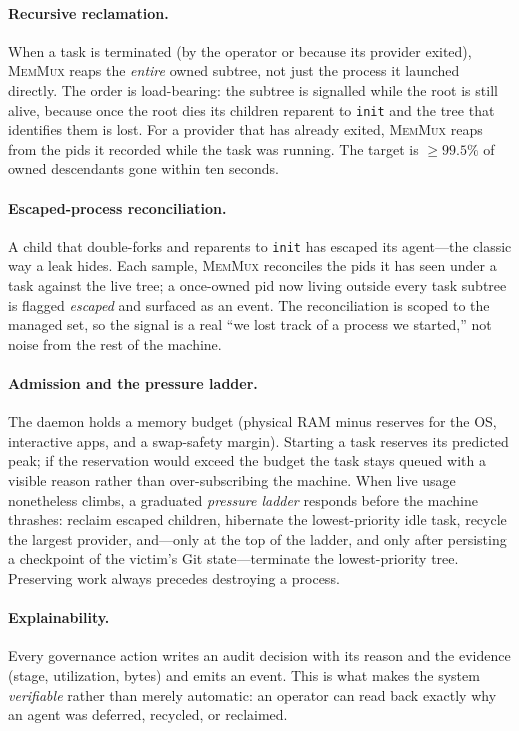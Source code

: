 \documentclass[11pt]{article}
\newcommand{\sys}{\textsc{MemMux}}
\newcommand{\code}[1]{\texttt{#1}}
\begin{document}
\paragraph{Recursive reclamation.} When a task is terminated (by the operator or because its
provider exited), \sys{} reaps the \emph{entire} owned subtree, not just the process it launched
directly. The order is load-bearing: the subtree is signalled while the root is still alive, because
once the root dies its children reparent to \code{init} and the tree that identifies them is lost.
For a provider that has already exited, \sys{} reaps from the pids it recorded while the task was
running. The target is $\geq 99.5\%$ of owned descendants gone within ten seconds.

\paragraph{Escaped-process reconciliation.} A child that double-forks and reparents to \code{init}
has escaped its agent---the classic way a leak hides. Each sample, \sys{} reconciles the pids it has
seen under a task against the live tree; a once-owned pid now living outside every task subtree is
flagged \emph{escaped} and surfaced as an event. The reconciliation is scoped to the managed set, so
the signal is a real ``we lost track of a process we started,'' not noise from the rest of the
machine.

\paragraph{Admission and the pressure ladder.} The daemon holds a memory budget (physical RAM minus
reserves for the OS, interactive apps, and a swap-safety margin). Starting a task reserves its
predicted peak; if the reservation would exceed the budget the task stays queued with a visible
reason rather than over-subscribing the machine. When live usage nonetheless climbs, a graduated
\emph{pressure ladder} responds before the machine thrashes: reclaim escaped children, hibernate the
lowest-priority idle task, recycle the largest provider, and---only at the top of the ladder, and
only after persisting a checkpoint of the victim's Git state---terminate the lowest-priority tree.
Preserving work always precedes destroying a process.

\paragraph{Explainability.} Every governance action writes an audit decision with its reason and the
evidence (stage, utilization, bytes) and emits an event. This is what makes the system
\emph{verifiable} rather than merely automatic: an operator can read back exactly why an agent was
deferred, recycled, or reclaimed.
\end{document}
